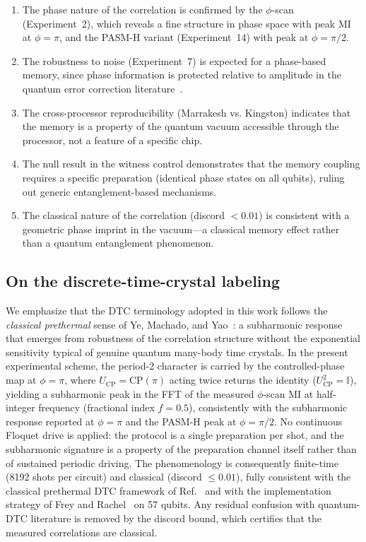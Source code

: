 \documentclass[12pt,a4paper]{article}
\begin{document}
\begin{enumerate}
    \item The phase nature of the correlation is confirmed by the $\phi$-scan (Experiment~2), which reveals a fine structure in phase space with peak MI at $\phi = \pi$, and the PASM-H variant (Experiment~14) with peak at $\phi = \pi/2$.
    \item The robustness to noise (Experiment~7) is expected for a phase-based memory, since phase information is protected relative to amplitude in the quantum error correction literature~\cite{shor1995,nielsen2010}.
    \item The cross-processor reproducibility (Marrakesh vs. Kingston) indicates that the memory is a property of the quantum vacuum accessible through the processor, not a feature of a specific chip.
    \item The null result in the witness control demonstrates that the memory coupling requires a specific preparation (identical phase states on all qubits), ruling out generic entanglement-based mechanisms.
    \item The classical nature of the correlation (discord $< 0.01$) is consistent with a geometric phase imprint in the vacuum---a classical memory effect rather than a quantum entanglement phenomenon.
\end{enumerate}

\subsection{On the discrete-time-crystal labeling}

We emphasize that the DTC terminology adopted in this work follows the \textit{classical prethermal} sense of Ye, Machado, and Yao~\cite{ye2021}: a subharmonic response that emerges from robustness of the correlation structure without the exponential sensitivity typical of genuine quantum many-body time crystals. In the present experimental scheme, the period-2 character is carried by the controlled-phase map at $\phi=\pi$, where $U_{\mathrm{CP}} = \mathrm{CP}(\pi)$ acting twice returns the identity ($U_{\mathrm{CP}}^2 = \mathbb{I}$), yielding a subharmonic peak in the FFT of the measured $\phi$-scan MI at half-integer frequency (fractional index $f=0.5$), consistently with the subharmonic response reported at $\phi=\pi$ and the PASM-H peak at $\phi=\pi/2$. No continuous Floquet drive is applied: the protocol is a single preparation per shot, and the subharmonic signature is a property of the preparation channel itself rather than of sustained periodic driving. The phenomenology is consequently finite-time (8192 shots per circuit) and classical (discord $\leq 0.01$), fully consistent with the classical prethermal DTC framework of Ref.~\cite{ye2021} and with the implementation strategy of Frey and Rachel~\cite{frey2022} on 57 qubits. Any residual confusion with quantum-DTC literature is removed by the discord bound, which certifies that the measured correlations are classical.
\end{document}
